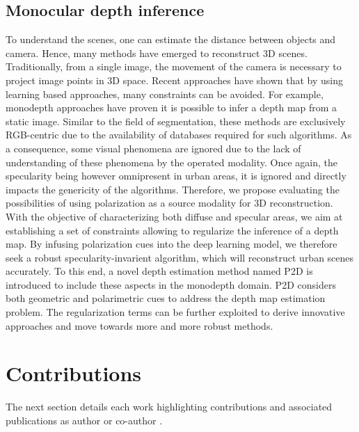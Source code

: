 \subsection{Monocular depth inference}
To understand the scenes, one can estimate the distance between objects and camera. Hence, many methods have emerged to reconstruct 3D scenes. Traditionally, from a single image, the movement of the camera is necessary to project image points in 3D space. Recent approaches have shown that by using learning based approaches, many constraints can be avoided. For example, monodepth approaches have proven it is possible to infer a depth map from a static image.
Similar to the field of segmentation, these methods are exclusively RGB-centric due to the availability of databases required for such algorithms. As a consequence, some visual phenomena are ignored due to the lack of understanding of these phenomena by the operated modality. Once again, the specularity being however omnipresent in urban areas, it is ignored and directly impacts the genericity of the algorithms.
Therefore, we propose evaluating the possibilities of using polarization as a source modality for 3D reconstruction. With the objective of characterizing both diffuse and specular areas, we aim at establishing a set of constraints allowing to regularize the inference of a depth map. By infusing polarization cues into the deep learning model, we therefore seek a robust specularity-invarient algorithm, which will reconstruct urban scenes accurately.
To this end, a novel depth estimation method named P2D is introduced to include these aspects in the monodepth domain. P2D considers both geometric and polarimetric cues to address the depth map estimation problem. The regularization terms can be further exploited to derive innovative approaches and move towards more and more robust methods.

\section{Contributions}
The next section details each work highlighting contributions and associated publications as author \cite{blanchon2019outdoor,blanchon2019utilisation,blanchon2021p2d,blanchon2021polarimetric,blanchon2020intro} or co-author \cite{zhang2019exploration,zhang2019explorationn}.

